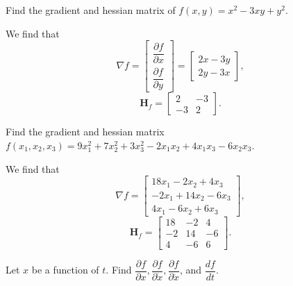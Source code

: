\begin{example}
    Find the gradient and hessian matrix of $f(x,y) = x^2-3xy+y^2.$
\end{example}
\begin{soln}
    We find that $$\nabla f =  \begin{bmatrix} \dfrac{\partial f}{\partial x} \\[2.2ex] \dfrac{\partial f}{\partial y} \end{bmatrix} = \begin{bmatrix} 2x-3y \\ 2y-3x \end{bmatrix},$$
    $$\mathbf{H}_f = \begin{bmatrix} 2 & -3 \\ -3 & 2 \end{bmatrix}.$$
\end{soln}
\begin{example}
    Find the gradient and hessian matrix $f(x_1,x_2,x_3) = 9x_1^2+7x_2^2+3x_3^2-2x_1x_2+4x_1x_3-6x_2x_3$.
\end{example}
\begin{soln}
    We find that $$\nabla f = \begin{bmatrix} 18x_1-2x_2+4x_3 \\ -2x_1+14x_2-6x_3 \\ 4x_1-6x_2+6x_3 \end{bmatrix},$$
    $$\mathbf{H}_f = \begin{bmatrix} 18 & -2 & 4 \\ -2 & 14 & -6 \\ 4 & -6 & 6\end{bmatrix}.$$
\end{soln}
\begin{example}
    Let $x$ be a function of $t$. Find $\dfrac{\partial f}{\partial x}, \dfrac{\partial f}{\partial \dot{x}},
    \dfrac{\partial f}{\partial \ddot{x}}$, and $\dfrac{df}{dt}$.
\end{example}
%

